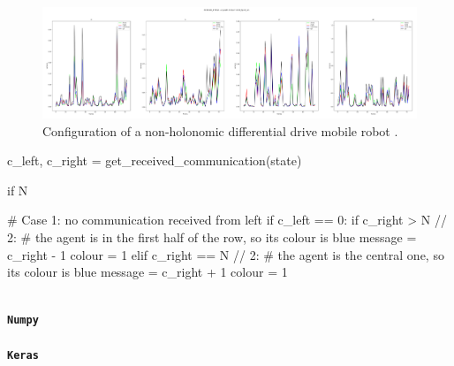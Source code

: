 \lipsum[2]

\bigskip

\begin{figure}[!htb]
	\centering
	\includegraphics[width=.55\textwidth]{"contents/images/20210110_172810 - origtest11030(len11030)_fps30_w5"}
	\caption[Non-holonomic differential drive mobile robot.]{Configuration of a 
		non-holonomic differential drive mobile robot 
		\cite[][]{shojaei2011adaptive}.}
	\label{fig:differentialdrive}
\end{figure}

\lipsum[2]

\bigskip

\begin{python}
c_left, c_right = get_received_communication(state)

if N %

# Case 1: no communication received from left
if c_left == 0:
if c_right > N // 2:
# the agent is in the first half of the row, so its colour is blue
message = c_right - 1
colour = 1
elif c_right == N // 2:
# the agent is the central one, so its colour is blue
message = c_right + 1
colour = 1
\end{python}
\begin{lstlisting}[frame=none,caption={Protocol used by the manual controller 
to decide, for each robot, the message to transmit and the colour.}, 
label=lst:manualtask2]
\end{lstlisting}


\paragraph*{\texttt{Numpy}}
\lipsum[1]


\paragraph*{\texttt{Keras}}
\lipsum[1]